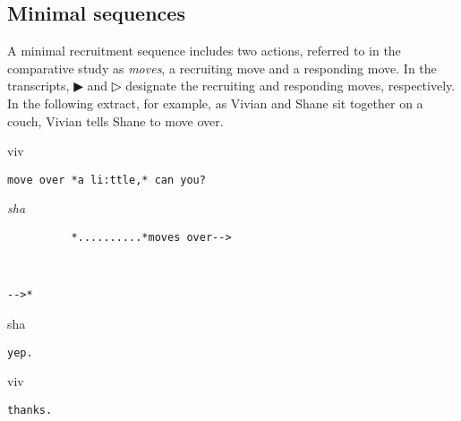 \documentclass[output=paper,nonflat,modfont,draft]{langsci/langscibook}
\begin{document}
\subsection{Minimal sequences}
A minimal recruitment sequence includes two actions, referred to in the comparative study as \textit{moves}, a recruiting move and a responding move. In the transcripts, ▶ and ▷ designate the recruiting and responding moves, respectively. In the following extract, for example, as Vivian and Shane sit together on a couch, Vivian tells Shane to move over.

\newpage
{}

\begin{mdframedkendrick}[style=firstfoc]
\begin{transbox}{1}{viv}
\begin{verbatim}
move over *a li:ttle,* can you?
\end{verbatim}
\end{transbox}
\end{mdframedkendrick}\vspace{-5mm}

\begin{mdframedkendrick}[style=secondfoc]
\begin{transbox}{2}{\textit{sha}}
\begin{verbatim}
          *..........*moves over-->
\end{verbatim}
\end{transbox}
\end{mdframedkendrick}\vspace{-5mm}


\begin{transbox}{4}{~}
\begin{verbatim}
-->*
\end{verbatim}
\end{transbox}

\begin{transbox}{5}{sha}
\begin{verbatim}
yep.
\end{verbatim}
\end{transbox}

\begin{transbox}{6}{viv}
\begin{verbatim}
thanks.
\end{verbatim}
\end{transbox}\bigskip
\end{document}
